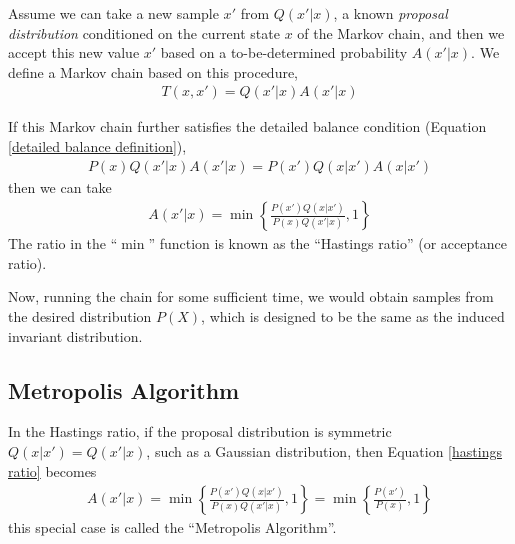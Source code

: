 Assume we can take a new sample $x'$ from $Q(x'|x)$, a known {\em{proposal distribution}} conditioned on the current state $x$ of the Markov chain, and then we accept this new value $x'$ based on a to-be-determined probability $A(x'|x)$. We define a Markov chain based on this procedure,
\begin{align}
	T(x,x') = Q(x'|x)A(x'|x)
\end{align}

If this Markov chain further satisfies the detailed balance condition (Equation \ref{detailed balance definition}),
\begin{align}
	P(x)Q(x'|x)A(x'|x) = P(x')Q(x|x')A(x|x') \label{detailed balance equation}
\end{align}
then we can take
\begin{align}
	A(x'|x) = \min \left\{ \frac{P(x')Q(x|x')}{P(x)Q(x'|x)}, 1 \right\} \label{hastings ratio}
\end{align}
The ratio in the ``$\min$'' function is known as the ``Hastings ratio'' (or acceptance ratio).

Now, running the chain for some sufficient time, we would obtain samples from the desired distribution $P(X)$, which is designed to be the same as the induced invariant distribution.


\subsection{Metropolis Algorithm}
In the Hastings ratio, if the proposal distribution is symmetric $Q(x|x') = Q(x'|x)$, such as a Gaussian distribution, then Equation \ref{hastings ratio} becomes
\begin{align}
	A(x'|x) = \min \left\{ \frac{P(x')Q(x|x')}{P(x)Q(x'|x)}, 1 \right\} = \min \left\{ \frac{P(x')}{P(x)}, 1 \right\}
\end{align}
this special case is called the ``Metropolis Algorithm''.

